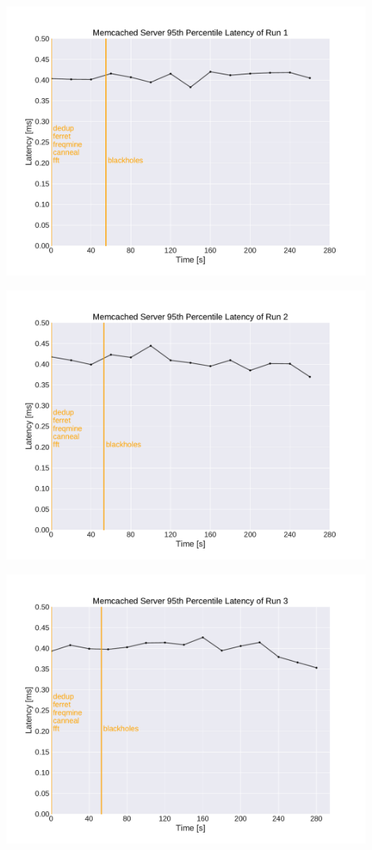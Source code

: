 \documentclass[11pt]{article}
\begin{document}
\begin{enumerate}
    \begin{center}
    {\includegraphics[width=0.9\textwidth]{m4.pdf}}
    \end{center}
    \begin{center}
    {\includegraphics[width=0.9\textwidth]{m5.pdf}}
    \end{center}
    \begin{center}
    {\includegraphics[width=0.9\textwidth]{m6.pdf}}
    \end{center}


\end{enumerate}
\end{document}
